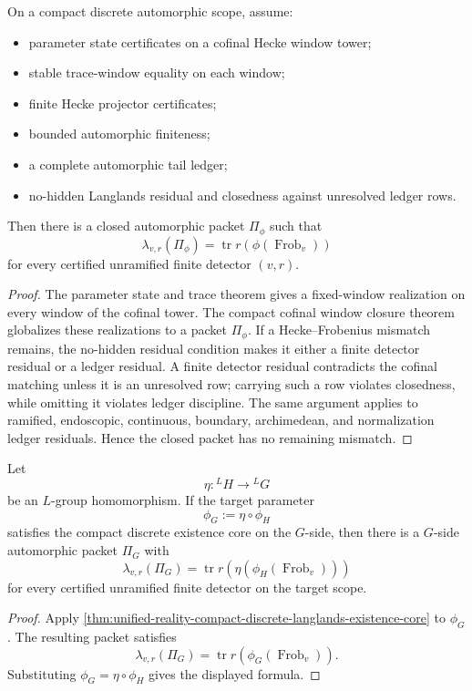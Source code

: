 \begin{theorem}
\label{thm:unified-reality-compact-discrete-langlands-existence-core}
On a compact discrete automorphic scope, assume:
\begin{itemize}
\item parameter state certificates on a cofinal Hecke window tower;
\item stable trace-window equality on each window;
\item finite Hecke projector certificates;
\item bounded automorphic finiteness;
\item a complete automorphic tail ledger;
\item no-hidden Langlands residual and closedness against unresolved
ledger rows.
\end{itemize}
Then there is a closed automorphic packet $\Pi_{\phi}$ such that
$$
\lambda_{v,r}(\Pi_{\phi})
=
\operatorname{tr}r(\phi(\operatorname{Frob}_v))
$$
for every certified unramified finite detector $(v,r)$.
\end{theorem}
\begin{proof}
The parameter state and trace theorem gives a fixed-window realization
on every window of the cofinal tower. The compact cofinal window closure
theorem globalizes these realizations to a packet $\Pi_{\phi}$. If a
Hecke--Frobenius mismatch remains, the no-hidden residual condition
makes it either a finite detector residual or a ledger residual. A finite
detector residual contradicts the cofinal matching unless it is an
unresolved row; carrying such a row violates closedness, while omitting
it violates ledger discipline. The same argument applies to ramified,
endoscopic, continuous, boundary, archimedean, and normalization ledger
residuals. Hence the closed packet has no remaining mismatch.
\end{proof}

\begin{theorem}
\label{thm:unified-reality-compact-discrete-functorial-core}
Let
$$
\eta:{}^LH\to{}^LG
$$
be an $L$-group homomorphism. If the target parameter
$$
\phi_G:=\eta\circ\phi_H
$$
satisfies the compact discrete existence core on the $G$-side, then
there is a $G$-side automorphic packet $\Pi_G$ with
$$
\lambda_{v,r}(\Pi_G)
=
\operatorname{tr}r(\eta(\phi_H(\operatorname{Frob}_v)))
$$
for every certified unramified finite detector on the target scope.
\end{theorem}
\begin{proof}
Apply
\autoref{thm:unified-reality-compact-discrete-langlands-existence-core}
to $\phi_G$. The resulting packet satisfies
$$
\lambda_{v,r}(\Pi_G)
=
\operatorname{tr}r(\phi_G(\operatorname{Frob}_v)).
$$
Substituting $\phi_G=\eta\circ\phi_H$ gives the displayed formula.
\end{proof}


